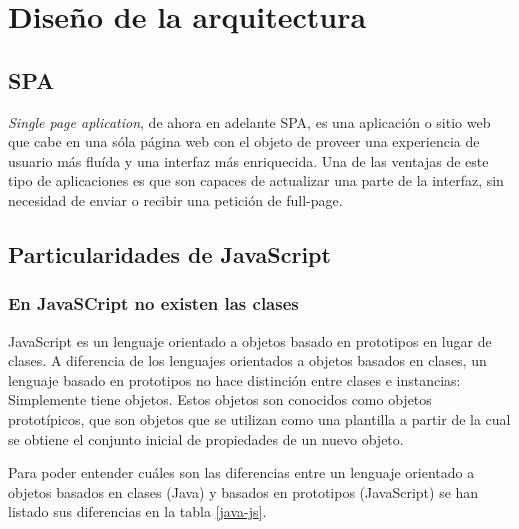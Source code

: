 \section{Diseño de la arquitectura}

\subsection{SPA}
\textit{Single page aplication}, de ahora en adelante SPA, es una aplicación o sitio web que cabe en una sóla página web con el objeto de proveer una experiencia de usuario más fluída y una interfaz más enriquecida. Una de las ventajas de este tipo de aplicaciones es que son capaces de actualizar una parte de la interfaz, sin necesidad de enviar o recibir una petición de full-page.


\subsection{Particularidades de JavaScript}
\subsubsection{En JavaSCript no existen las clases}
JavaScript es un lenguaje orientado a objetos basado en prototipos en lugar de clases. A diferencia de los lenguajes orientados a objetos basados en clases, un lenguaje basado en prototipos no hace distinción entre clases e instancias: Simplemente tiene objetos. Estos objetos son conocidos como objetos prototípicos, que son objetos que se utilizan como una plantilla a partir de la cual se obtiene el conjunto inicial de propiedades de un nuevo objeto\cite{fernandomonteiro2014}.


Para poder entender cuáles son las diferencias entre un lenguaje orientado a objetos basados en clases (Java) y basados en prototipos (JavaScript) se han listado sus diferencias en la tabla \ref{java-js}.


